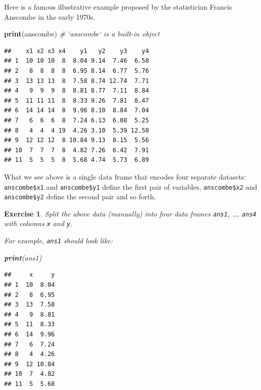 \documentclass[10pt,b5paper,krantz1]{krantz}
\newenvironment{Shaded}{\begin{snugshade}}{\end{snugshade}}
\newcommand{\CommentTok}[1]{\textcolor[rgb]{0.37,0.37,0.37}{\textit{#1}}}
\newcommand{\KeywordTok}[1]{\textcolor[rgb]{0.27,0.27,0.27}{\textbf{#1}}}
\newcommand{\NormalTok}[1]{#1}
\newtheorem{exercise}{Exercise}[chapter]
\begin{document}
Here is a famous illustrative example proposed by
the statistician Francis Anscombe in the early 1970s.

\begin{Shaded}
\begin{Highlighting}[]
\KeywordTok{print}\NormalTok{(anscombe) }\CommentTok{# `anscombe` is a built-in object}
\end{Highlighting}
\end{Shaded}

\begin{verbatim}
##    x1 x2 x3 x4    y1   y2    y3    y4
## 1  10 10 10  8  8.04 9.14  7.46  6.58
## 2   8  8  8  8  6.95 8.14  6.77  5.76
## 3  13 13 13  8  7.58 8.74 12.74  7.71
## 4   9  9  9  8  8.81 8.77  7.11  8.84
## 5  11 11 11  8  8.33 9.26  7.81  8.47
## 6  14 14 14  8  9.96 8.10  8.84  7.04
## 7   6  6  6  8  7.24 6.13  6.08  5.25
## 8   4  4  4 19  4.26 3.10  5.39 12.50
## 9  12 12 12  8 10.84 9.13  8.15  5.56
## 10  7  7  7  8  4.82 7.26  6.42  7.91
## 11  5  5  5  8  5.68 4.74  5.73  6.89
\end{verbatim}

What we see above is a single data frame
that encodes four separate datasets:
\texttt{anscombe\$x1} and \texttt{anscombe\$y1} define the first pair of variables,
\texttt{anscombe\$x2} and \texttt{anscombe\$y2} define the second pair and so forth.

\begin{exercise}

Split the above data (manually) into four data frames
\texttt{ans1}, \ldots{}, \texttt{ans4} with columns \texttt{x} and \texttt{y}.

For example, \texttt{ans1} should look like:

\begin{Shaded}
\begin{Highlighting}[]
\KeywordTok{print}\NormalTok{(ans1)}
\end{Highlighting}
\end{Shaded}

\begin{verbatim}
##     x     y
## 1  10  8.04
## 2   8  6.95
## 3  13  7.58
## 4   9  8.81
## 5  11  8.33
## 6  14  9.96
## 7   6  7.24
## 8   4  4.26
## 9  12 10.84
## 10  7  4.82
## 11  5  5.68
\end{verbatim}

\end{exercise}
\end{document}
